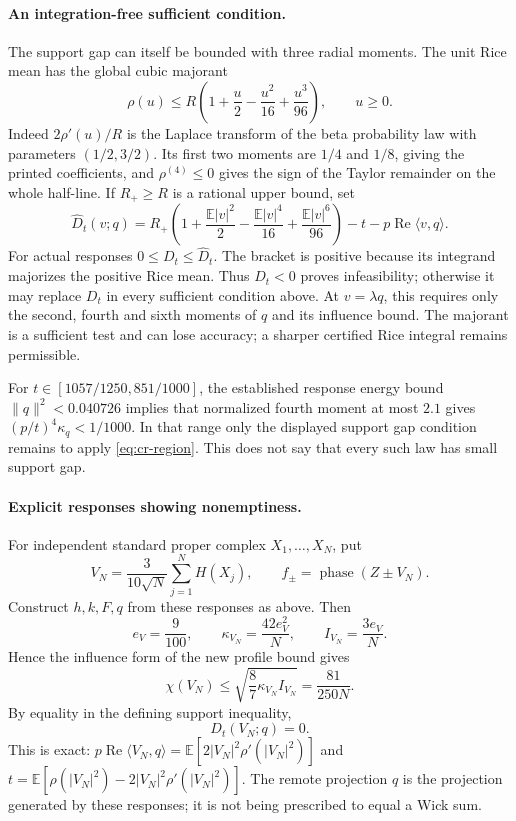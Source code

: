 \paragraph{An integration-free sufficient condition.}
The support gap can itself be bounded with three radial moments. The
unit Rice mean has the global cubic majorant
\begin{equation}\label{eq:cr-rice-cubic}
 \rho(u)\le R\left(1+\frac u2-\frac{u^2}{16}+\frac{u^3}{96}\right),
 \qquad u\ge0.
\end{equation}
Indeed $2\rho'(u)/R$ is the Laplace transform of the beta probability
law with parameters $(1/2,3/2)$. Its first two moments are $1/4$ and
$1/8$, giving the printed coefficients, and $\rho^{(4)}\le0$ gives
the sign of the Taylor remainder on the whole half-line.
If $R_+\ge R$ is a rational upper bound, set
\[
 \widehat D_t(v;q)=R_+\left(1+\frac{\mathbb E|v|^2}{2}
      -\frac{\mathbb E|v|^4}{16}+\frac{\mathbb E|v|^6}{96}\right)
       -t-p\operatorname{Re}\langle v,q\rangle.
\]
For actual responses $0\le D_t\le\widehat D_t$. The bracket is
positive because its integrand majorizes the positive Rice mean.
Thus $\widehat D_t<0$ proves infeasibility; otherwise it may replace
$D_t$ in every sufficient condition above. At $v=\lambda q$, this
requires only the second, fourth and sixth moments of $q$ and its
influence bound. The majorant is a sufficient test and can lose
accuracy; a sharper certified Rice integral remains permissible.

For $t\in[1057/1250,851/1000]$, the established response energy bound
$\|q\|^2<0.040726$ implies that normalized fourth moment at most $2.1$
gives $(p/t)^4\kappa_q<1/1000$. In that range only the displayed support
gap condition remains to apply \eqref{eq:cr-region}. This does not say
that every such law has small support gap.

\paragraph{Explicit responses showing nonemptiness.}
For independent standard proper complex $X_1,\ldots,X_N$, put
\[
 V_N=\frac3{10\sqrt N}\sum_{j=1}^N H(X_j),
 \qquad f_\pm=\operatorname{phase}(Z\pm V_N).
\]
Construct $h,k,F,q$ from these responses as above. Then
\begin{equation}\label{eq:cr-wick-moments}
 e_V=\frac9{100},\qquad
 \kappa_{V_N}=\frac{42e_V^2}{N},\qquad I_{V_N}=\frac{3e_V}{N}.
\end{equation}
Hence the influence form of the new profile bound gives
\[
 \chi(V_N)\le\sqrt{\frac87\kappa_{V_N}I_{V_N}}
              =\frac{81}{250N}.
\]
By equality in the defining support inequality,
\[
 D_t(V_N;q)=0.
\]
This is exact: $p\operatorname{Re}\langle V_N,q\rangle
=\mathbb E[2|V_N|^2\rho'(|V_N|^2)]$ and
$t=\mathbb E[\rho(|V_N|^2)-2|V_N|^2\rho'(|V_N|^2)]$.
The remote projection $q$ is the projection generated by these
responses; it is not being prescribed to equal a Wick sum.

